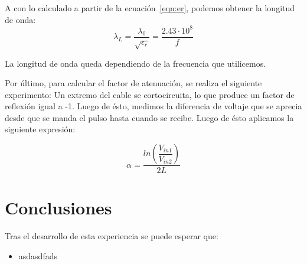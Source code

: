 \documentclass[11pt,onecolumn]{article}
\begin{document}
A con lo calculado a partir de la ecuación~\ref{eqn:er}, podemos obtener la longitud de onda:
\begin{equation}
\lambda_{L} = \dfrac{\lambda_{0}}{\sqrt{\epsilon_{r}}} = \dfrac{2.43\cdot 10^{8}}{f}
\end{equation}

La longitud de onda queda dependiendo de la frecuencia que utilicemos. 

Por último, para calcular el factor de atenuación, se realiza el siguiente experimento: Un extremo del cable se cortocircuita, lo que produce un factor de reflexión igual a -1. Luego de ésto, medimos la diferencia de voltaje que se aprecia desde que se manda el pulso hasta cuando se recibe. Luego de ésto aplicamos la siguiente expresión:

\begin{equation}
\alpha = \dfrac{ln\left(\dfrac{V_{in1}}{V_{in2}}\right)}{2L}
\end{equation}



\newpage
\section{Conclusiones}

Tras el desarrollo de esta experiencia se puede esperar que:
\begin{itemize}
\item asdasdfads

\end{itemize}
\end{document}
